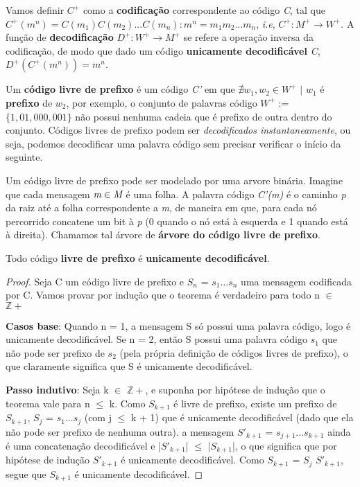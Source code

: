 Vamos definir \emph{$C^+$} como a \textbf{codificação} correspondente ao código \emph{C}, tal que $C^+(m^n) = C(m_1)C(m_2)...C(m_n) : m^n = m_1m_2...m_n$, \emph{i.e}, \emph{$C^+ : M^+ \rightarrow W^+$}. A função de \textbf{decodificação} \emph{$D^+ : W^+ \rightarrow M^+$} se refere a operação inversa da codificação, de modo que dado um código \textbf{unicamente decodificável} \emph{C}, $D^+(C^+(m^n)) = m^n$.

Um \textbf{código livre de prefixo} é um código \emph{C'} em que $\nexists w_1, w_2 \in W^+$ $|$ $w_1$ é \textbf{prefixo} de $w_2$, por exemplo, o conjunto de palavras código \emph{$W^+$} := $\{1, 01, 000, 001\}$ não possui nenhuma cadeia que é prefixo de outra dentro do conjunto. Códigos livres de prefixo podem ser \emph{decodificados instantaneamente}, ou seja, podemos decodificar uma palavra código sem precisar verificar o início da seguinte.

Um código livre de prefixo pode ser modelado por uma arvore binária. Imagine que cada mensagem $\emph{m} \in \emph{M}$ é uma folha. A palavra código \emph{C'(m)} é o caminho \emph{p} da raiz até a folha correspondente a \emph{m}, de maneira em que, para cada nó percorrido concatene um bit à \emph{p} (0 quando o nó está à esquerda e 1 quando está à direita). Chamamos tal árvore de \textbf{árvore do código livre de prefixo}.

\begin{theorem}
Todo código \textbf{livre de prefixo} é \textbf{unicamente decodificável}.

\begin{proof}
Seja C um código livre de prefixo e $S_n$ = $s_1...s_n$ uma mensagem codificada por C. Vamos provar por indução que o teorema é verdadeiro para todo n $\in$ $\mathbb{Z+}$

\item \textbf{Casos base}: Quando n = 1, a mensagem S só possui uma palavra código, logo é unicamente decodificável. Se n = 2, então S possui uma palavra código $s_1$ que não pode ser prefixo de $s_2$ (pela própria definição de códigos livres de prefixo), o que claramente significa que S é unicamente decodificável.

\item \textbf{Passo indutivo}: Seja k $\in$ $\mathbb{Z+}$, e suponha por hipótese de indução que o teorema vale para n $\leq$ k. Como $S_{k+1}$ é livre de prefixo, existe um prefixo de $S_{k+1}$, $S_j$ = $s_1...s_j$ (com j $\leq$ k + 1) que é unicamente decodificável (dado que ela não pode ser prefixo de nenhuma outra). a mensagem $S'_{k+1}$ = $s_{j+1}...s_{k+1}$ ainda é uma concatenação decodificável e |$S'_{k+1}$| $\leq$ |$S_{k+1}$|, o que significa que por hipótese de indução $S'_{k+1}$ é unicamente decodificável. Como $S_{k+1}$ = $S_j$ $S'_{k+1}$, segue que $S_{k+1}$ é unicamente decodificável.
\end{proof}
\end{theorem}

